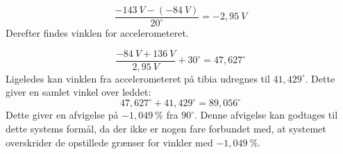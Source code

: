 \begin{equation}
\dfrac{-143~V-(-84~V)}{20^{\circ}}=-2,95~V
\end{equation}
Derefter findes vinklen for accelerometeret.

\begin{equation}
\dfrac{-84~V+136~V}{2,95~V}+30^{\circ}=47,627^{\circ}
\end{equation}
Ligeledes kan vinklen fra accelerometeret på tibia udregnes til $41,429^{\circ}$. Dette giver en samlet vinkel over leddet: 
%
\begin{equation}
47,627^{\circ}+41,429^{\circ}=89,056^{\circ}
\end{equation}
Dette giver en afvigelse på $-1,049~\%$ fra $90^{\circ}$. Denne afvigelse kan godtages til dette systems formål, da der ikke er nogen fare forbundet med, at systemet overskrider de opstillede grænser for vinkler med $-1,049~\%$.









